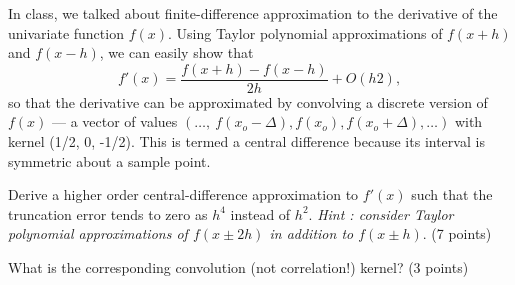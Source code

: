 \begin{problem}
  In class, we talked about finite-difference approximation
  to the derivative of the univariate function $f(x)$.
  Using Taylor polynomial approximations of $f(x + h)$ and $f(x - h)$,
  we can easily show that \[ f'(x) = \frac{f(x + h) - f(x - h)}{2h} + O(h2), \]
  so that the derivative can be approximated by convolving
  a discrete version of $f(x)$ --- a vector of values
  $(\ldots,\ f(x_{o} - \Delta), f(x_{o}), f(x_{o}+ \Delta), \ldots)$
  with kernel (1/2, 0, -1/2).
  This is termed a central difference because its interval is symmetric about a sample point.

  \begin{enumroman}
    \item Derive a higher order central-difference approximation
      to $f'(x)$ such that the truncation error tends to zero
      as $h^4$ instead of $h^2$.
      \emph{Hint : consider Taylor polynomial approximations of $f(x \pm 2h)$
        in addition to $f(x \pm h)$}. (7 points)
    \item What is the corresponding convolution (not correlation!) kernel? (3 points)

  \end{enumroman}
\end{problem}
